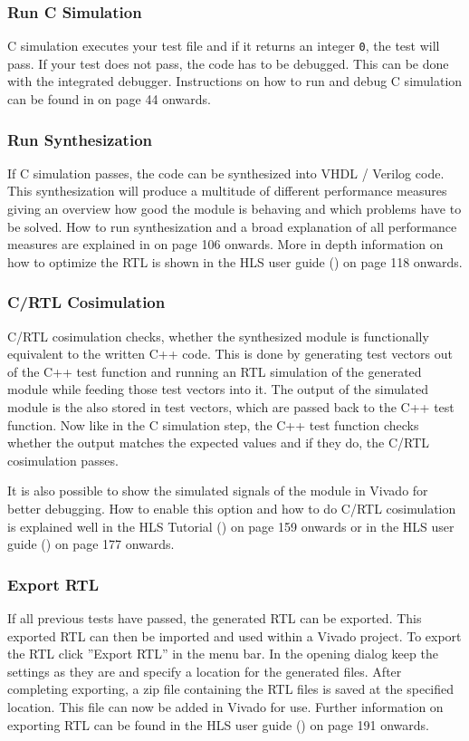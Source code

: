 \subsubsection{Run C Simulation}
C simulation executes your test file and if it returns an integer \texttt{0}, the test will pass. If your test does not pass, the code has to be debugged. This can be done with the integrated debugger. Instructions on how to run and debug C simulation can be found in \cite{xilinx:hls_tutorial} on page 44 onwards.

\subsubsection{Run Synthesization}
If C simulation passes, the code can be synthesized into VHDL / Verilog code. This synthesization will produce a multitude of different performance measures giving an overview how good the module is behaving and which problems have to be solved. How to run synthesization and a broad explanation of all performance measures are explained in \cite{xilinx:hls_tutorial} on page 106 onwards. More in depth information on how to optimize the RTL is shown in the HLS user guide (\cite{xilinx:hls_bible}) on page 118 onwards.

\subsubsection{C/RTL Cosimulation}
C/RTL cosimulation checks, whether the synthesized module is functionally equivalent to the written C++ code. This is done by generating test vectors out of the C++ test function and running an RTL simulation of the generated module while feeding those test vectors into it. The output of the simulated module is the also stored in test vectors, which are passed back to the C++ test function. Now like in the C simulation step, the C++ test function checks whether the output matches the expected values and if they do, the C/RTL cosimulation passes.

It is also possible to show the simulated signals of the module in Vivado for better debugging. How to enable this option and how to do C/RTL cosimulation is explained well in the HLS Tutorial (\cite{xilinx:hls_tutorial}) on page 159 onwards or in the HLS user guide (\cite{xilinx:hls_bible}) on page 177 onwards.

\subsubsection{Export RTL}
If all previous tests have passed, the generated RTL can be exported. This exported RTL can then be imported and used within a Vivado project. To export the RTL click ''Export RTL'' in the menu bar. In the opening dialog keep the settings as they are and specify a location for the generated files. After completing exporting, a zip file containing the RTL files is saved at the specified location. This file can now be added in Vivado for use. Further information on exporting RTL can be found in the HLS user guide (\cite{xilinx:hls_bible}) on page 191 onwards.


